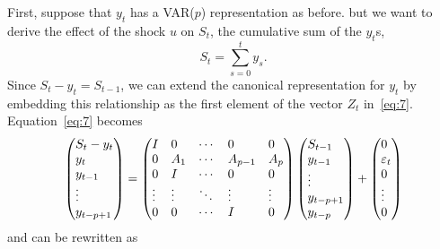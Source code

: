 \documentclass[12pt,fleqn]{article}
\begin{document}
First, suppose that $y_t$ has a VAR($p$) representation as before.
but we want to derive the effect of the shock $u$ on $S_t$, the
cumulative sum of the $y_t$s,
\[
  S_t = \sum_{s=0}^t y_s.
\]
Since $S_t - y_t = S_{t-1}$, we can extend the canonical
representation for $y_t$ by embedding this relationship as the first
element of the vector $Z_t$ in~\eqref{eq:7}. Equation~\eqref{eq:7}
becomes
\begin{equation*}
  \begin{pmatrix*}[l]
    S_t - y_t \\ y_t \\ y_{t-1} \\ \vdots \\ y_{t-p+1}
  \end{pmatrix*}
  =
  \begin{pmatrix*}[l]
    I      & 0      & \cdots & 0       & 0      \\
    0      & A_1    & \cdots & A_{p-1} & A_p    \\
    0      & I      & \cdots & 0       & 0      \\
    \vdots & \vdots & \ddots & \vdots  & \vdots \\
    0      & 0      & \cdots & I       & 0
  \end{pmatrix*}
  \begin{pmatrix*}[l]
    S_{t-1}  \\ y_{t-1} \\ \vdots \\ y_{t-p+1} \\ y_{t-p}
  \end{pmatrix*}
  +
  \begin{pmatrix*}[l]
    0 \\ \vep_t \\ 0 \\ \vdots \\ 0
  \end{pmatrix*}
\end{equation*}
and can be rewritten as
\end{document}

